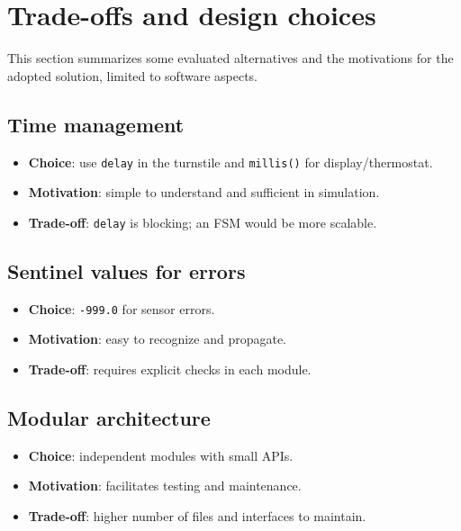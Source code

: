 \chapter{Trade-offs and design choices}

This section summarizes some evaluated alternatives and the motivations for the adopted solution, limited to software aspects.

\section{Time management}
\begin{itemize}
  \item \textbf{Choice}: use \texttt{delay} in the turnstile and \texttt{millis()} for display/thermostat.
  \item \textbf{Motivation}: simple to understand and sufficient in simulation.
  \item \textbf{Trade-off}: \texttt{delay} is blocking; an FSM would be more scalable.
\end{itemize}

\section{Sentinel values for errors}
\begin{itemize}
  \item \textbf{Choice}: \texttt{-999.0} for sensor errors.
  \item \textbf{Motivation}: easy to recognize and propagate.
  \item \textbf{Trade-off}: requires explicit checks in each module.
\end{itemize}

\section{Modular architecture}
\begin{itemize}
  \item \textbf{Choice}: independent modules with small APIs.
  \item \textbf{Motivation}: facilitates testing and maintenance.
  \item \textbf{Trade-off}: higher number of files and interfaces to maintain.
\end{itemize}
